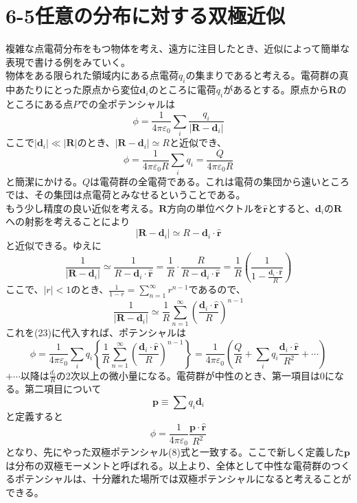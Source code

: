 \documentclass{jsarticle}
\begin{document}
\section*{6-5\hspace{5mm}任意の分布に対する双極近似}
\noindent
複雑な点電荷分布をもつ物体を考え、遠方に注目したとき、近似によって簡単な表現で書ける例をみていく。\\
物体をある限られた領域内にある点電荷\(q_{i}\)の集まりであると考える。電荷群の真中あたりにとった原点から変位\(\bm{d}_{i}\)のところに電荷\(q_{i}\)があるとする。原点から\(\bm{R}\)のところにある点\(P\)での全ポテンシャルは
\begin{equation}
\phi=\frac{1}{4\pi\varepsilon_{0}}\sum_{i}\frac{q_{i}}{\left|\bm{R}-\bm{d}_{i}\right|}
\end{equation}
ここで\(\left|\bm{d}_{i}\right|\ll\left|\bm{R}\right|\)のとき、\(\left|\bm{R}-\bm{d}_{i}\right|\simeq R\)と近似でき、
\begin{equation}
\phi=\frac{1}{4\pi\varepsilon_{0}R}\sum_{i}q_{i}=\frac{Q}{4\pi\varepsilon_{0}R}
\end{equation}
と簡潔にかける。\(Q\)は電荷群の全電荷である。これは電荷の集団から遠いところでは、その集団は点電荷とみなせるということである。\\
もう少し精度の良い近似を考える。\(\bm{R}\)方向の単位ベクトルを\(\bm{\hat{r}}\)とすると、\(\bm{d}_{i}\)の\(\bm{R}\)への射影を考えることにより
\[\left|\bm{R}-\bm{d}_{i}\right|\simeq R-\bm{d}_{i}\cdot\bm{\hat{r}}\]
と近似できる。ゆえに
\[\frac{1}{\left|\bm{R}-\bm{d}_{i}\right|}\simeq\frac{1}{R-\bm{d}_{i}\cdot\bm{\hat{r}}}=\frac{1}{R}\cdot\frac{R}{R-\bm{d}_{i}\cdot\bm{\hat{r}}}=
\frac{1}{R}\left(\frac{1}{1-\frac{\bm{d}_{i}\cdot\bm{\hat{r}}}{R}}\right)\]
ここで、\(\left|r\right|<1\)のとき、\(\displaystyle\frac{1}{1-r}=\sum_{n=1}^{\infty}r^{n-1}\)であるので、
\begin{equation}
\frac{1}{\left|\bm{R}-\bm{d}_{i}\right|}\simeq\frac{1}{R}\sum_{n=1}^{\infty}\left(\frac{\bm{d}_{i}\cdot\bm{\hat{r}}}{R}\right)^{n-1}
\end{equation}
これを(23)に代入すれば、ポテンシャルは
\begin{equation}
\phi=\frac{1}{4\pi\varepsilon_{0}}\sum_{i}q_{i}\left\{\frac{1}{R}\sum_{n=1}^{\infty}\left(\frac{\bm{d}_{i}\cdot\bm{\hat{r}}}{R}\right)^{n-1}\right\}=\frac{1}{4\pi\varepsilon_{0}}\left(\frac{Q}{R}+\sum_{i}q_{i}\frac{\bm{d}_{i}\cdot\bm{\hat{r}}}{R^{2}}+\cdots\right)
\end{equation}
\(+\cdots\)以降は\(\frac{d_{i}}{R}\)の2次以上の微小量になる。電荷群が中性のとき、第一項目は0になる。第二項目について
\begin{equation}
\bm{p}\equiv\sum q_{i}\bm{d}_{i}
\end{equation}
と定義すると
\begin{equation}
\phi=\frac{1}{4\pi\varepsilon_{0}}\frac{\bm{p}\cdot\bm{\hat{r}}}{R^{2}}
\end{equation}
となり、先にやった双極ポテンシャル(8)式と一致する。ここで新しく定義した\(\bm{p}\)は分布の双極モーメントと呼ばれる。以上より、全体として中性な電荷群のつくるポテンシャルは、十分離れた場所では双極ポテンシャルになると考えることができる。\\
\\
\end{document}
